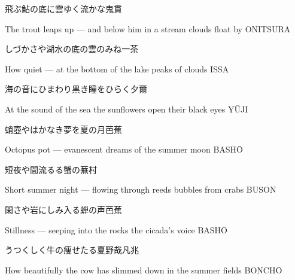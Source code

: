 \begin{haiku}
    {\FH 飛ぶ鮎の底に雲ゆく流かな}\hfill{\FH 鬼貫}

    \vin{} The trout leaps up ---
    \vin{} \vin{} and below him in a stream
    \vin{} \vin{} \vin{} clouds float by \hspace{\fill} ONITSURA
\end{haiku}

\begin{haiku}
    {\FH しづかさや湖水の底の雲のみね}\hfill{\FH 一茶}

    \vin{} How quiet ---
    \vin{} \vin{} at the bottom of the lake
    \vin{} \vin{} \vin{} peaks of clouds \hspace{\fill} ISSA
\end{haiku}

\begin{haiku}
    {\FH 海の音にひまわり黒き瞳をひらく}\hfill{\FH 夕爾}

    \vin{} At the sound of the sea
    \vin{} \vin{} the sunflowers open
    \vin{} \vin{} \vin{} their black eyes \hspace{\fill} Y\={U}JI
\end{haiku}

\begin{haiku}
    {\FH 蛸壺やはかなき夢を夏の月}\hfill{\FH 芭蕉}

    \vin{} Octopus pot ---
    \vin{} \vin{} evanescent dreams
    \vin{} \vin{} \vin{} of the summer moon \hspace{\fill} BASH\={O}
\end{haiku}

\begin{haiku}
    {\FH 短夜や間流るる蟹の}\hfill{\FH 蕪村}

    \vin{} Short summer night ---
    \vin{} \vin{} flowing through reeds
    \vin{} \vin{} \vin{} bubbles from crabs \hspace{\fill} BUSON
\end{haiku}

\begin{haiku}
    {\FH 閑さや岩にしみ入る蝉の声}\hfill{\FH 芭蕉}

    \vin{} Stillness ---
    \vin{} \vin{} seeping into the rocks
    \vin{} \vin{} \vin{} the cicada's voice \hspace{\fill} BASH\={O}
\end{haiku}

\begin{haiku}
    {\FH うつくしく牛の痩せたる夏野哉}\hfill{\FH 凡兆}

    \vin{} How beautifully
    \vin{} \vin{} the cow has slimmed down
    \vin{} \vin{} \vin{} in the summer fields \hspace{\fill} BONCH\={O}
\end{haiku}

